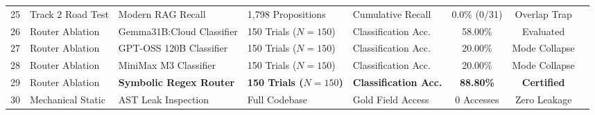 \begin{table}[htbp]
{\begin{tabular}{rllllccc}
25 & Track 2 Road Test & Modern RAG Recall & 1,798 Propositions & Cumulative Recall & 0.0\% (0/31) & Overlap Trap \\
26 & Router Ablation & Gemma31B:Cloud Classifier & 150 Trials ($N=150$) & Classification Acc. & 58.00\% & Evaluated \\
27 & Router Ablation & GPT-OSS 120B Classifier & 150 Trials ($N=150$) & Classification Acc. & 20.00\% & Mode Collapse \\
28 & Router Ablation & MiniMax M3 Classifier & 150 Trials ($N=150$) & Classification Acc. & 20.00\% & Mode Collapse \\
29 & Router Ablation & \textbf{Symbolic Regex Router} & \textbf{150 Trials ($N=150$)} & \textbf{Classification Acc.} & \textbf{88.80\%} & \textbf{Certified} \\
30 & Mechanical Static & AST Leak Inspection & Full Codebase & Gold Field Access & 0 Accesses & Zero Leakage \\
\bottomrule
\end{tabular}
}
\end{table}
